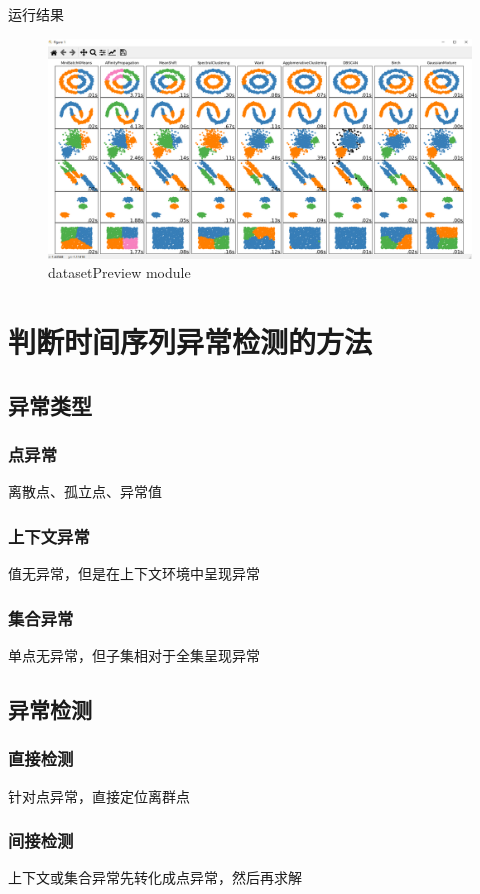\documentclass[UTF8]{ctexart}
\begin{document}
运行结果
\begin{figure}[ht]
\centering
\includegraphics[scale=0.4]{resultBenchmarkpic.png}
\caption{datasetPreview module}
\end{figure}


\section{判断时间序列异常检测的方法}
    \subsection{异常类型}
        \subsubsection{点异常}
        离散点、孤立点、异常值
        \subsubsection{上下文异常}
        值无异常，但是在上下文环境中呈现异常
        \subsubsection{集合异常}
        单点无异常，但子集相对于全集呈现异常
    \subsection{异常检测}
        \subsubsection{直接检测}
        针对点异常，直接定位离群点
        \subsubsection{间接检测}
        上下文或集合异常先转化成点异常，然后再求解
\end{document}
